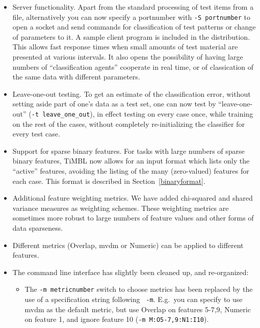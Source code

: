 \documentclass{book}
\begin{document}
\begin{itemize}

\item Server functionality. Apart from the standard processing of test
items from a file, alternatively you can now specify a portnumber with
{\tt -S portnumber} to open a socket and send commands for
classification of test patterns or change of parameters to it. A
sample client program is included in the distribution. This allows
fast response times when small amounts of test material are presented
at various intervals. It also opens the possibility of having large
numbers of ``classification agents'' cooperate in real time, or of
classication of the same data with different parameters.

\item Leave-one-out testing. To get an estimate of the classification
error, without setting aside part of one's data as a test set, one
can now test by ``leave-one-out'' ({\tt -t leave\_one\_out}), in effect
testing on every case once, while training on the rest of the cases,
without completely re-initializing the classifier for every test case.

\item Support for sparse binary features. For tasks with large numbers
of sparse binary features, TiMBL now allows for an input format which
lists only the ``active'' features, avoiding the listing of the many
(zero-valued) features for each case. This format is described in
Section~\ref{binaryformat}.

\item Additional feature weighting metrics. We have added chi-squared
and shared variance measures as weighting schemes. These weighting
metrics are sometimes more robust to large numbers of feature values
and other forms of data sparseness.

\item Different metrics (Overlap, {\sc mvdm} or Numeric) can be
applied to different features.

\item The command line interface has slightly been cleaned up, and
re-organized:

\begin{itemize}

\item The {\tt -m metricnumber} switch to choose metrics has been
replaced by the use of a specification string following {\tt
-m}. E.g.~you can specify to use {\sc mvdm} as the default metric, but
use Overlap on features 5-7,9, Numeric on feature 1, and ignore
feature 10 ({\tt -m M:O5-7,9:N1:I10}).


\end{itemize}
\end{itemize}
\end{document}
